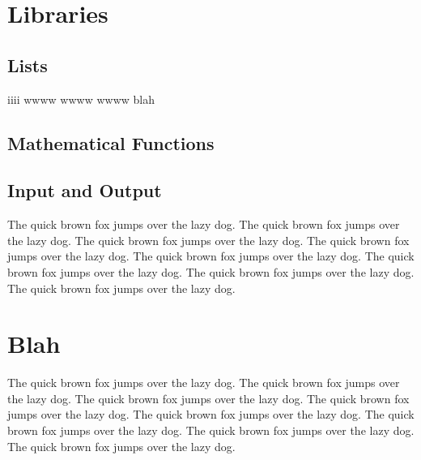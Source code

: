 \documentclass{refcard}
\begin{document}
\section{Libraries}


\subsection{Lists \hfill {}}

\begin{ldesc}
	\li[iiii] iiii
	\li[wwww] wwww
	\li[iiii] wwww
	\li       wwww
	\li[blah] blah
\end{ldesc}

\subsection{Mathematical Functions \hfill {}}


\subsection{Input and Output \hfill {}}


The quick brown fox jumps over the lazy dog.
The quick brown fox jumps over the lazy dog.
The quick brown fox jumps over the lazy dog.
The quick brown fox jumps over the lazy dog.
The quick brown fox jumps over the lazy dog.
The quick brown fox jumps over the lazy dog.
The quick brown fox jumps over the lazy dog.
The quick brown fox jumps over the lazy dog.

\section{Blah}

The quick brown fox jumps over the lazy dog.
The quick brown fox jumps over the lazy dog.
The quick brown fox jumps over the lazy dog.
The quick brown fox jumps over the lazy dog.
The quick brown fox jumps over the lazy dog.
The quick brown fox jumps over the lazy dog.
The quick brown fox jumps over the lazy dog.
The quick brown fox jumps over the lazy dog.
\end{document}
